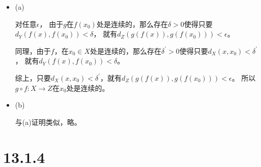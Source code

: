 \documentclass{article}
\begin{document}
\begin{itemize}
  \item (a)

        对任意$\epsilon$，
        由于$g$在$f(x_0)$处是连续的，那么存在$\delta > 0$使得只要$d_Y(f(x), f(x_0)) < \delta$，
        就有$d_Z(g(f(x)), g(f(x_0))) < \epsilon$。

        同理，由于$f$，在$x_0 \in X$处是连续的，那么存在$\delta^\prime > 0$使得只要$d_X(x, x_0) < \delta^\prime$，
        就有$d_Y(f(x), f(x_0)) < \delta$。

        综上，只要$d_X(x, x_0) < \delta^\prime$，就有$d_Z(g(f(x)), g(f(x_0))) < \epsilon$。
        所以$g \circ f : X \to Z$在$x_0$处是连续的。

  \item (b)

        与(a)证明类似，略。

\end{itemize}

\section*{13.1.4}
\end{document}

